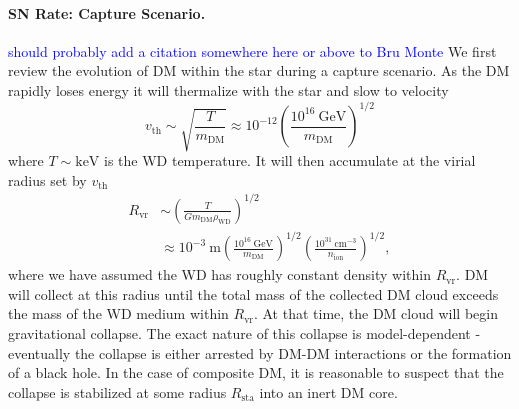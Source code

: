 \documentclass[twocolumn,preprintnumbers,amsmath,amssymb,prd, superscriptaddress]{revtex4} %
\newcommand{\GeV}{\text{GeV}}
\newcommand{\keV}{\text{keV}}
\newcommand{\cm}{\text{cm}}
\def\r{\right)}
\def\l{\left(}
\begin{document}
\paragraph{SN Rate: Capture Scenario.}
\textcolor{blue}{should probably add a citation somewhere here or above to Bru Monte}
We first review the evolution of DM within the star during a capture scenario.
As the DM rapidly loses energy it will thermalize with the star and slow to velocity
\begin{equation}
v_\text{th} \sim \sqrt{\frac{T}{m_\text{DM}}} \approx 10^{-12} \l \frac{10^{16} ~\GeV}{m_\text{DM}}\r^{1/2}
\end{equation}
where $T \sim \keV$ is the WD temperature.
It will then accumulate at the virial radius set by $v_\text{th}$
\begin{align}
  R_\text{vr} &\sim \l \frac{T}{G m_\text{DM} \rho_\text{WD}}\r^{1/2} \\
  &\approx 10^{-3} ~\text{m} \l \frac{10^{16} ~\GeV}{m_\text{DM}}\r^{1/2}
  \l \frac{10^{31} ~\cm^{-3}}{n_\text{ion}}\r^{1/2}, \nonumber
\end{align}
where we have assumed the WD has roughly constant density within $R_\text{vr}$.
DM will collect at this radius until the total mass of the collected DM cloud exceeds the mass of the WD medium within $R_\text{vr}$.
At that time, the DM cloud will begin gravitational collapse.
The exact nature of this collapse is model-dependent - eventually the collapse is either arrested by DM-DM interactions or the formation of a black hole.
In the case of composite DM, it is reasonable to suspect that the collapse is stabilized at some radius $R_\text{sta}$ into an inert DM core.

\end{document}
